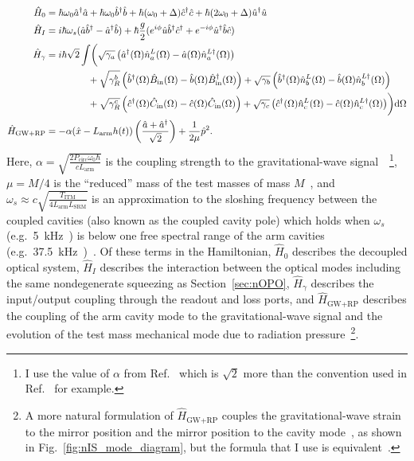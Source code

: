 \begin{align}\label{eq:nIS_Hamiltonian}
\hat H_0 &= \hbar \omega_0 \hat a^\dag \hat a + \hbar \omega_0 \hat b^\dag \hat b+ \hbar (\omega_0+\Delta) \hat c^\dag \hat c + \hbar (2\omega_0+\Delta) \hat u^\dag \hat u\\
\hat H_I &= i\hbar\omega_s(\hat a\hat b^\dag-\hat a^\dag\hat b) + \hbar \frac{g}{2} (e^{i\phi} \hat u \hat b^\dag \hat c^\dag+e^{-i\phi} \hat u^\dag \hat b \hat c) \\
\hat H_\gamma &= i\hbar \sqrt{2}\int \biggl( \sqrt{\gamma_a}\left(\hat{a}^\dag(\Omega)\hat n^L_a(\Omega)-\hat{a}(\Omega)\hat{n}^{L\dag}_a(\Omega)\right) \\
& \hspace*{1.55cm} + \sqrt{\gamma^b_R}\left(\hat{b}^\dag(\Omega)\hat{B}_\text{in}(\Omega)-\hat{b}(\Omega)\hat{B}_\text{in}^\dag(\Omega)\right) + \sqrt{\gamma_b}\left(\hat{b}^\dag(\Omega)\hat n^L_b(\Omega)-\hat{b}(\Omega)\hat{n}^{L\dag}_b(\Omega)\right) \nonumber \\
& \hspace*{1.55cm} + \sqrt{\gamma^c_R}\left(\hat{c}^\dag(\Omega)\hat C_\text{in}(\Omega)-\hat{c}(\Omega)\hat C_\text{in}(\Omega)\right) + \sqrt{\gamma_c}\left(\hat{c}^\dag(\Omega)\hat n^L_c(\Omega)-\hat{c}(\Omega)\hat{n}^{L\dag}_c(\Omega)\right)\biggr)\text{d}\Omega \nonumber\\
\hat H_\text{GW+RP} &= -\alpha (\hat{x}-L_\mathrm{arm}h(t))\left(\frac{\hat{a}+\hat{a}^\dag}{\sqrt{2}}\right)+\frac{1}{2\mu}\hat{p}^2.
\end{align}
Here, $\alpha=\sqrt{\frac{2 P_\text{circ} \omega_0 \hbar}{c  L_\text{arm}}}$ is the coupling strength to the gravitational-wave signal~\cite{liBroadbandSensitivityImprovement2020}~\footnote{I use the value of $\alpha$ from Ref.~\cite{liBroadbandSensitivityImprovement2020} which is $\sqrt2$ more than the convention used in Ref.~\cite{korobkoQuantumExpanderGravitationalwave2019} for example.}, $\mu=M/4$ is the ``reduced'' mass of the test masses of mass $M$~\cite{}, and $\omega_s\approx c\sqrt{\frac{T_\text{ITM}}{4 L_\text{arm} L_\text{SRM}}}$ is an approximation to the sloshing frequency between the coupled cavities (also known as the coupled cavity pole) which holds when $\omega_s$ (e.g.\ 5~kHz~\cite{}) is below one free spectral range of the arm cavities (e.g.\ 37.5~kHz~\cite{})~\cite{}.
Of these terms in the Hamiltonian, $\hat H_0$ describes the decoupled optical system, $\hat H_I$ describes the interaction between the optical modes including the same nondegenerate squeezing as Section~\ref{sec:nOPO}, $\hat H_\gamma$ describes the input/output coupling through the readout and loss ports, and $\hat H_\text{GW+RP}$ describes the coupling of the arm cavity mode to the gravitational-wave signal and the evolution of the test mass mechanical mode due to radiation pressure~\footnote{A more natural formulation of $\hat H_\text{GW+RP}$ couples the gravitational-wave strain to the mirror position and the mirror position to the cavity mode~\cite{}, as shown in Fig.~\ref{fig:nIS_mode_diagram}, but the formula that I use is equivalent~\cite{}.}.
